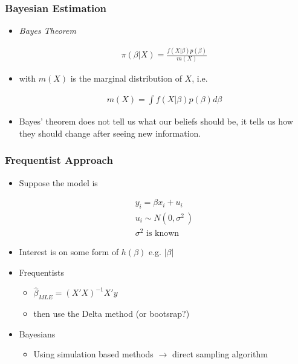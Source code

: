 \documentclass[
  shownotes,
  xcolor={svgnames},
  hyperref={colorlinks,citecolor=DarkBlue,linkcolor=DarkRed,urlcolor=DarkBlue}
  , aspectratio=169]{beamer}
\begin{document}
\begin{frame}[fragile]
\frametitle{Bayesian Estimation}

\begin{itemize}


\item {\it Bayes Theorem}

\medskip
\begin{align}
\pi (\beta|X)=\frac{f(X|\beta)p(\beta)}{m(X)}
\end{align}

\medskip
\item with $m(X)$ is the marginal distribution of $X$, i.e.

\medskip
\begin{align}
m(X)=\int f(X|\beta)p(\beta)d\beta
\end{align}
\medskip
\item Bayes' theorem  does not tell us what our beliefs should be, it tells us how they should change after seeing new information.
\end{itemize}

\end{frame}
\begin{frame}[fragile]
\frametitle{Frequentist Approach}

\begin{itemize}
    \item Suppose the model is 
    
    \begin{align}
        y_{i} = \beta x_{i} + u_{i} \\
         u_{i} \sim N(0, \sigma^{2}\ )  \\
        \sigma^{2}\text{ is known}
    \end{align}

    \item Interest is on some form of $h(\beta)$ e.g. $|\beta|$
    \medskip
    \item Frequentists 
    \begin{itemize}
    \medskip
    \item $\hat{\beta}_{MLE}=(X'X)^{-1}X'y$
    \medskip
    \item then use the Delta method (or bootsrap?)
    \end{itemize}
    \medskip
    \item Bayesians
    \medskip
    \begin{itemize}
        \item Using simulation based methods $\rightarrow$ direct sampling algorithm
    \end{itemize}
\end{itemize}


\end{frame}
\end{document}
